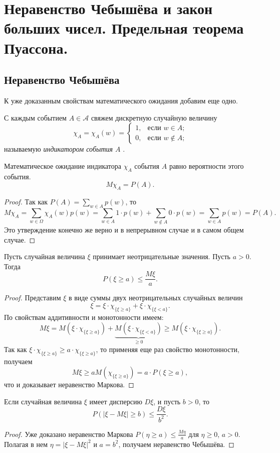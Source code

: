 \chapter{Неравенство Чебышёва и закон больших чисел. Предельная теорема Пуассона.}
\section{Неравенство Чебышёва}

К уже доказанным свойствам математического ожидания добавим еще одно.
\begin{defn}
С каждым событием $A \in \mathcal{A}$ свяжем дискретную случайную величину
$$
\chi_A =\chi_A(w)=\begin{cases}
1,&\text{если $w \in A$;}\\
0,&\text{если $w \notin A$;}
\end{cases}
$$
называемую \textit{индикатором события $A$} .
\end{defn}
\begin{thm}
Математическое ожидание индикатора $\chi_A$ события $A$ равно вероятности этого события.
$$
M\chi_A=P(A).
$$ 
\end{thm}
\begin{proof}
Так как $P(A)=\sum\limits_{w\in A}p(w)$, то 
$$
M\chi_A=\sum\limits_{w\in\Omega}\chi_A(w)p(w)=\sum\limits_{w\in A}1\cdot p(w)+\sum\limits_{w\notin A}0\cdot p(w)=\sum\limits_{w\in A}p(w)=P(A).
$$
Это утверждение конечно же верно и в непрерывном случае и в самом общем случае.
\end{proof}

\begin{thm}
Пусть случайная величина $\xi$ принимает неотрицательные значения. Пусть $a>0$. Тогда 
$$
P(\xi \ge a)\le\frac{M\xi}{a}.
$$
\end{thm}
\begin{proof}
Представим $\xi$ в виде суммы двух неотрицательных случайных величин
$$
\xi = \xi\cdot\chi_{\{\xi\ge a\}}+\xi\cdot\chi_{\{\xi< a\}}.
$$
По свойствам аддитивности и монотонности имеем:
$$
M \xi=M (\xi\cdot\chi_{\{\xi\ge a\}})+\underbrace{M (\xi\cdot\chi_{\{\xi< a\}})}_{\ge 0} \ge M (\xi\cdot\chi_{\{\xi\ge a\}}).
$$
Так как $\xi\cdot\chi_{\{\xi\ge a\}}\ge a\cdot\chi_{\{\xi\ge a\}}$, то применяя еще раз свойство монотонности, получаем
$$
M \xi\ge aM (\chi_{\{\xi\ge a\}})=a\cdot P(\xi\ge a),
$$
что и доказывает неравенство Маркова.
\end{proof}

\begin{thm}
Если случайная величина $\xi$ имеет дисперсию $D \xi$, и пусть $b>0$, то
$$
P(|\xi-M \xi|\ge b ) \le\frac{D \xi}{b^2}.
$$
\end{thm} 
\begin{proof}
Уже доказано неравенство Маркова $P(\eta \ge a) \le \frac{M\eta}{a}$  для $\eta \ge 0$, $a>0$. Полагая в нем $\eta = |\xi-M \xi|^2$ и $a=b^2$, получаем неравенство Чебышёва.
\end{proof}


